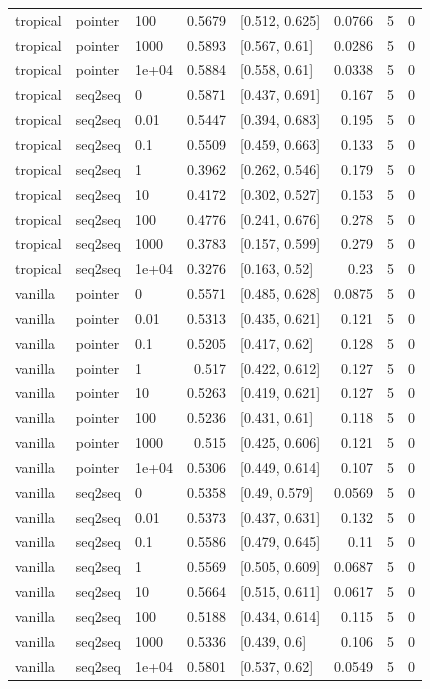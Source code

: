 \documentclass[10pt]{article}
\begin{document}
{\begin{longtable}{lllrlrrr}
tropical & pointer & 100 & 0.5679 & [0.512, 0.625] & 0.0766 & 5 & 0\\
tropical & pointer & 1000 & 0.5893 & [0.567, 0.61] & 0.0286 & 5 & 0\\
tropical & pointer & 1e+04 & 0.5884 & [0.558, 0.61] & 0.0338 & 5 & 0\\
tropical & seq2seq & 0 & 0.5871 & [0.437, 0.691] & 0.167 & 5 & 0\\
tropical & seq2seq & 0.01 & 0.5447 & [0.394, 0.683] & 0.195 & 5 & 0\\
tropical & seq2seq & 0.1 & 0.5509 & [0.459, 0.663] & 0.133 & 5 & 0\\
tropical & seq2seq & 1 & 0.3962 & [0.262, 0.546] & 0.179 & 5 & 0\\
tropical & seq2seq & 10 & 0.4172 & [0.302, 0.527] & 0.153 & 5 & 0\\
tropical & seq2seq & 100 & 0.4776 & [0.241, 0.676] & 0.278 & 5 & 0\\
tropical & seq2seq & 1000 & 0.3783 & [0.157, 0.599] & 0.279 & 5 & 0\\
tropical & seq2seq & 1e+04 & 0.3276 & [0.163, 0.52] & 0.23 & 5 & 0\\
vanilla & pointer & 0 & 0.5571 & [0.485, 0.628] & 0.0875 & 5 & 0\\
vanilla & pointer & 0.01 & 0.5313 & [0.435, 0.621] & 0.121 & 5 & 0\\
vanilla & pointer & 0.1 & 0.5205 & [0.417, 0.62] & 0.128 & 5 & 0\\
vanilla & pointer & 1 & 0.517 & [0.422, 0.612] & 0.127 & 5 & 0\\
vanilla & pointer & 10 & 0.5263 & [0.419, 0.621] & 0.127 & 5 & 0\\
vanilla & pointer & 100 & 0.5236 & [0.431, 0.61] & 0.118 & 5 & 0\\
vanilla & pointer & 1000 & 0.515 & [0.425, 0.606] & 0.121 & 5 & 0\\
vanilla & pointer & 1e+04 & 0.5306 & [0.449, 0.614] & 0.107 & 5 & 0\\
vanilla & seq2seq & 0 & 0.5358 & [0.49, 0.579] & 0.0569 & 5 & 0\\
vanilla & seq2seq & 0.01 & 0.5373 & [0.437, 0.631] & 0.132 & 5 & 0\\
vanilla & seq2seq & 0.1 & 0.5586 & [0.479, 0.645] & 0.11 & 5 & 0\\
vanilla & seq2seq & 1 & 0.5569 & [0.505, 0.609] & 0.0687 & 5 & 0\\
vanilla & seq2seq & 10 & 0.5664 & [0.515, 0.611] & 0.0617 & 5 & 0\\
vanilla & seq2seq & 100 & 0.5188 & [0.434, 0.614] & 0.115 & 5 & 0\\
vanilla & seq2seq & 1000 & 0.5336 & [0.439, 0.6] & 0.106 & 5 & 0\\
vanilla & seq2seq & 1e+04 & 0.5801 & [0.537, 0.62] & 0.0549 & 5 & 0\\
\bottomrule
\end{longtable}
}
\end{document}
